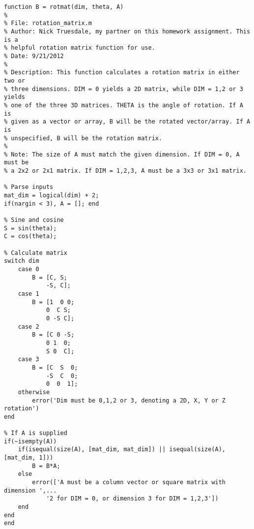 \documentclass[12pt,a4paper,oneside]{article}
\begin{document}
\begin{appendix}
\begin{lstlisting}
function B = rotmat(dim, theta, A)
%
% File: rotation_matrix.m
% Author: Nick Truesdale, my partner on this homework assignment. This is a
% helpful rotation matrix function for use. 
% Date: 9/21/2012
%
% Description: This function calculates a rotation matrix in either two or
% three dimensions. DIM = 0 yields a 2D matrix, while DIM = 1,2 or 3 yields
% one of the three 3D matrices. THETA is the angle of rotation. If A is
% given as a vector or array, B will be the rotated vector/array. If A is
% unspecified, B will be the rotation matrix.
%
% Note: The size of A must match the given dimension. If DIM = 0, A must be
% a 2x2 or 2x1 matrix. If DIM = 1,2,3, A must be a 3x3 or 3x1 matrix.

% Parse inputs
mat_dim = logical(dim) + 2;
if(nargin < 3), A = []; end

% Sine and cosine
S = sin(theta);
C = cos(theta);

% Calculate matrix
switch dim
    case 0
        B = [C, S;
            -S, C];
    case 1
        B = [1  0 0;
            0  C S;
            0 -S C];
    case 2
        B = [C 0 -S;
            0 1  0;
            S 0  C];
    case 3
        B = [C  S  0;
            -S  C  0;
            0  0  1];
    otherwise
        error('Dim must be 0,1,2 or 3, denoting a 2D, X, Y or Z rotation')
end

% If A is supplied
if(~isempty(A))
    if(isequal(size(A), [mat_dim, mat_dim]) || isequal(size(A), [mat_dim, 1]))
        B = B*A;
    else
        error(['A must be a column vector or square matrix with dimension ',...
            '2 for DIM = 0, or dimension 3 for DIM = 1,2,3'])
    end
end
end

\end{lstlisting}
\end{appendix}
\end{document}
